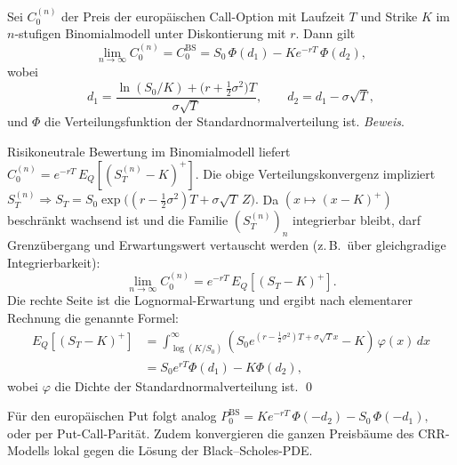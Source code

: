 \begin{bsp}
Sei $C_0^{(n)}$ der Preis der europäischen Call-Option mit Laufzeit $T$ und Strike $K$
im $n$-stufigen Binomialmodell unter Diskontierung mit $r$. Dann gilt
\[
\lim_{n\to\infty} C_0^{(n)}
= C_0^{\mathrm{BS}}
= S_0\,\Phi(d_1) - K e^{-rT}\,\Phi(d_2),
\]
wobei
\[
d_1 = \frac{\ln(S_0/K) + \big(r + \tfrac12 \sigma^2\big)T}{\sigma \sqrt{T}},
\qquad
d_2 = d_1 - \sigma \sqrt{T},
\]
und $\Phi$ die Verteilungsfunktion der Standardnormalverteilung ist.
\textit{Beweis}.

Risikoneutrale Bewertung im Binomialmodell liefert
$
C_0^{(n)} = e^{-rT}\,E_Q\!\left[(S_T^{(n)} - K)^+\right].
$
Die obige Verteilungskonvergenz impliziert
$
S_T^{(n)} \Rightarrow S_T = S_0 \exp\!\big((r-\tfrac12\sigma^2)T + \sigma \sqrt{T}\,Z\big).
$
Da $(x\mapsto (x-K)^+)$ beschränkt wachsend ist und die Familie $(S_T^{(n)})_n$ integrierbar bleibt,
darf Grenzübergang und Erwartungswert vertauscht werden (z.\,B.\ über gleichgradige Integrierbarkeit):
$$
\lim_{n\to\infty} C_0^{(n)} = e^{-rT}\,E_Q\!\left[(S_T - K)^+\right].
$$
Die rechte Seite ist die Lognormal-Erwartung und ergibt nach elementarer Rechnung die genannte Formel:
\begin{align*}
E_Q\!\left[(S_T - K)^+\right]
&= \int_{\log(K/S_0)}^\infty (S_0 e^{(r-\frac12\sigma^2)T + \sigma \sqrt{T} x} - K)\,\varphi(x)\,dx \\
&= S_0 e^{rT} \Phi(d_1) - K \Phi(d_2),
\end{align*}
wobei $\varphi$ die Dichte der Standardnormalverteilung ist.
\qed
\end{bsp}

\begin{bem}
Für den europäischen Put folgt analog
$
P_0^{\mathrm{BS}} = K e^{-rT}\,\Phi(-d_2) - S_0\,\Phi(-d_1),
$
oder per Put-Call-Parität. Zudem konvergieren die ganzen Preisbäume des CRR-Modells lokal gegen die Lösung der Black–Scholes-PDE.
\end{bem}